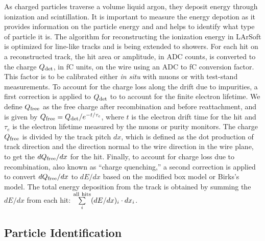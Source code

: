 As charged particles traverse a volume liquid argon, they deposit
energy through ionization and scintillation. It is important to
measure the energy depotion as it provides information on the particle
energy and and helps to identify what type of particle it is. The algorithm for reconstructing the ionization
energy in LArSoft is optimized for line-like tracks and is being
extended to showers. 
For each hit on a reconstructed track, the hit area or amplitude, in ADC counts, is
converted to the charge $Q_{\rm{det}}$, in fC units, on the wire using an
ADC to fC conversion factor.  This factor is to be calibrated either {\it in situ} with muons or with
test-stand measurements. To account for the charge loss along the drift due to
impurities, a first correction is applied to $Q_{\rm{det}}$ to to account for the finite
electron lifetime.  We define $Q_{\rm{free}}$ as the free charge after recombination
and before reattachment, and is given by  $Q_{\rm{free}} = Q_{\rm{det}}/e^{-t/\tau_{e}}$, where
$t$ is the electron drift time for the hit and $\tau_{e}$ is the
electron lifetime measured by the muons or purity monitors. The charge
$Q_{\rm{free}}$ is divided by the track pitch $dx$, which is defined as the
dot production of track direction and the direction normal to the wire
direction in the wire plane, to get the $dQ_{\rm{free}}/dx$ for the
hit. Finally, to account for charge loss due to recombination, also
known as ``charge quenching,'' a second correction is applied to
convert $dQ_{\rm{free}}/dx$ to $dE/dx$ based on the modified box model
\cite{Thomas:1987zz} or Birks's model\cite{Birks:1964zz}. The total energy
deposition from the track is obtained by summing the $dE/dx$ from each
hit: $\sum\limits_{i}^{\rm{all\ hits}}(dE/dx)_{i}\cdot dx_{i}$.

%


\subsection{Particle Identification}

